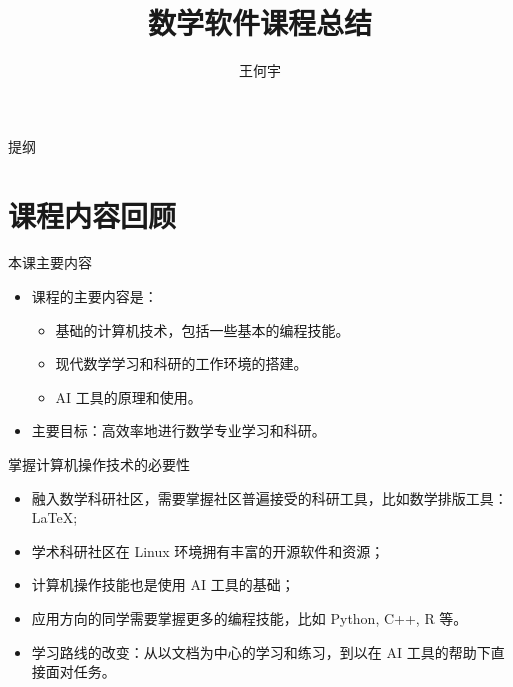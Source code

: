 \documentclass{beamer}
\title[Beamer + xelatex] %
{\Huge 数学软件课程总结}
\author[Wang HY] %
{王何宇}
\institute[ZJU] %
{
  浙江大学数学科学学院\\
  信息与计算科学系
}
\date[] %
{}
\begin{document}
\begin{frame}
 \titlepage
\end{frame}

\begin{frame}{提纲}
  \tableofcontents
\end{frame}


\section{课程内容回顾}

\begin{frame}{本课主要内容}
  \begin{itemize}
  \item<1-> 课程的主要内容是：
    \begin{itemize}
    \item<1-> 基础的计算机技术，包括一些基本的编程技能。
    \item<1-> 现代数学学习和科研的工作环境的搭建。
    \item<1-> AI 工具的原理和使用。
    \end{itemize}
  \item<2-> 主要目标：高效率地进行数学专业学习和科研。\cite{robbins1951stochastic}
  \end{itemize}
\end{frame}

\begin{frame}{掌握计算机操作技术的必要性}
  \begin{itemize}
  \item<1-> 融入数学科研社区，需要掌握社区普遍接受的科研工具，比如数学排版工具：\LaTeX;
  \item<2-> 学术科研社区在 Linux 环境拥有丰富的开源软件和资源；
  \item<3-> 计算机操作技能也是使用 AI 工具的基础；
  \item<4-> 应用方向的同学需要掌握更多的编程技能，比如 Python, C++, R 等。
  \item<5-> {\color{red} 学习路线的改变：从以文档为中心的学习和练习，到以在 AI 工具的帮助下直接面对任务。}
  \end{itemize}
\end{frame}
\end{document}

